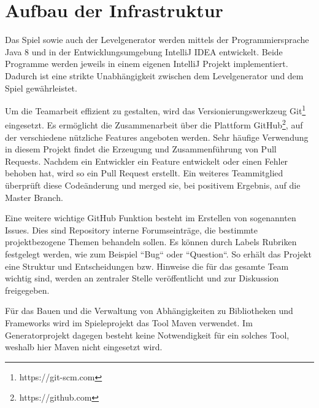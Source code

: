 \section{Aufbau der Infrastruktur}

Das Spiel sowie auch der Levelgenerator werden mittels der Programmiersprache Java 8 und in der Entwicklungsumgebung IntelliJ IDEA entwickelt. Beide Programme werden jeweils in einem eigenen IntelliJ Projekt implementiert.
Dadurch ist eine strikte Unabhängigkeit zwischen dem Levelgenerator und dem Spiel gewährleistet.

Um die Teamarbeit effizient zu gestalten, wird das Versionierungswerkzeug Git\footnote{https://git-scm.com} eingesetzt.
Es ermöglicht die Zusammenarbeit über die Plattform GitHub\footnote{https://github.com}, auf der verschiedene nützliche Features angeboten werden.
Sehr häufige Verwendung in diesem Projekt findet die Erzeugung und Zusammenführung von Pull Requests.
Nachdem ein Entwickler ein Feature entwickelt oder einen Fehler behoben hat, wird so ein Pull Request erstellt.
Ein weiteres Teammitglied überprüft diese Codeänderung und merged sie, bei positivem Ergebnis, auf die Master Branch.

Eine weitere wichtige GitHub Funktion besteht im Erstellen von sogenannten Issues.
Dies sind Repository interne Forumseinträge, die bestimmte projektbezogene Themen behandeln sollen.
Es können durch Labels Rubriken festgelegt werden, wie zum Beispiel ``Bug`` oder ``Question``.
So erhält das Projekt eine Struktur und Entscheidungen bzw. Hinweise die für das gesamte Team wichtig sind, werden an zentraler Stelle veröffentlicht und zur Diskussion freigegeben.

Für das Bauen und die Verwaltung von Abhängigkeiten zu Bibliotheken und Frameworks wird im Spieleprojekt das Tool Maven verwendet.
Im Generatorprojekt dagegen besteht keine Notwendigkeit für ein solches Tool, weshalb hier Maven nicht eingesetzt wird.

